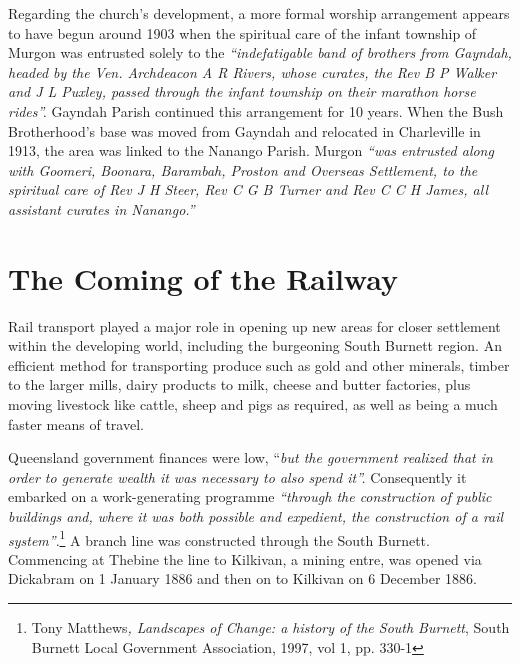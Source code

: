 Regarding the church's development, a more formal worship arrangement appears to have begun around 1903 when the spiritual care of the infant township of Murgon was entrusted solely to the \emph{``indefatigable band of brothers from Gayndah, headed by the Ven. Archdeacon A R Rivers, whose curates, the Rev B P Walker and J L Puxley, passed through the infant township on their marathon horse rides''.} Gayndah Parish continued this arrangement for 10 years. When the Bush Brotherhood's base was moved from Gayndah and relocated in Charleville in 1913, the area was linked to the Nanango Parish. Murgon \emph{``was entrusted along with Goomeri, Boonara, Barambah, Proston and Overseas Settlement, to the spiritual care of Rev J H Steer, Rev C G B Turner and Rev C C H James, all assistant curates in Nanango.''}



\section{The Coming of the Railway}



\balance


Rail transport played a major role in opening up new areas for closer settlement within the developing world, including the burgeoning South Burnett region. An efficient method for transporting produce such as gold and other minerals, timber to the larger mills, dairy products to milk, cheese and butter factories, plus moving livestock like cattle, sheep and pigs as required, as well as being a much faster means of travel.



Queensland government finances were low, ``\emph{but the government realized that in order to generate wealth it was necessary to also spend it''.} Consequently it embarked on a work-generating programme \emph{``through the construction of public buildings and, where it was both possible and expedient, the construction of a rail system''}.\footnote{Tony Matthews\emph{, Landscapes of Change: a history of the South Burnett}, South Burnett Local Government Association, 1997, vol 1, pp. 330-1} A branch line was constructed through the South Burnett. Commencing at Thebine the line to Kilkivan, a mining entre, was opened via Dickabram on 1 January 1886 and then on to Kilkivan on 6 December 1886.


